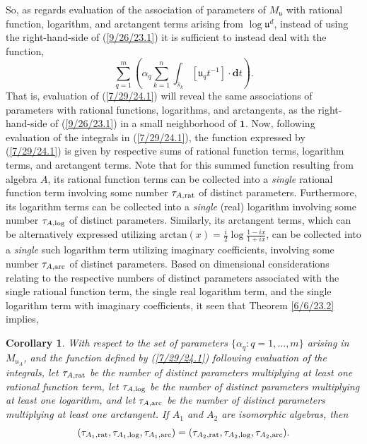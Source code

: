 \documentclass{amsart}
\numberwithin{equation}{section}
\newtheorem{corollary}[theorem]{Corollary}
\theoremstyle{definition}
\numberwithin{theorem}{section}
\begin{document}
So, as regards evaluation of the association of parameters of $M_{\mathfrak{u}}$ with rational function, logarithm, and arctangent terms arising from $\log\mathfrak{u}^d$, instead of using the right-hand-side of (\ref{9/26/23.1}) it is sufficient to instead deal with the function,
\begin{equation}\label{7/29/24.1} \sum_{q=1}^m \left(\alpha_q\sum_{k=1}^n \int_{\hat{s}_k} [\mathfrak{u}_q t^{-1}]\cdot \mathbf{d}t\right).\end{equation} That is, evaluation of (\ref{7/29/24.1}) will reveal the same associations of parameters with rational functions, logarithms, and arctangents, as the right-hand-side of (\ref{9/26/23.1}) in a small neighborhood of $\mathbf{1}$.  Now, following evaluation of the integrals in (\ref{7/29/24.1}), the function expressed by (\ref{7/29/24.1}) is given by respective sums of rational function terms, logarithm terms, and arctangent terms.  Note that for this summed function resulting from algebra $A$, its rational function terms can be collected into a {\it single} rational function term involving some number $\tau_{A,{\rm rat}}$ of distinct parameters.  Furthermore, its logarithm terms can be collected into a {\it single} (real) logarithm involving some number $\tau_{A,{\rm log}}$ of distinct parameters.  Similarly, its arctangent terms, which can be alternatively expressed utilizing $\text{arctan}(x) = \frac{i}{2}\log\frac{1-ix}{1+ix}$, can be collected into a {\it single} such logarithm term utilizing imaginary coefficients, involving some number $\tau_{A,{\rm arc}}$ of distinct parameters. 
Based on dimensional considerations relating to the respective numbers of distinct parameters associated with the single rational function term, the single real logarithm term, and the single logarithm term with imaginary coefficients, it seen that Theorem \ref{6/6/23.2} implies,


\begin{corollary}\label{7/25/24.1} With respect to the set of parameters $\{\alpha_q:q=1,\dots,m\}$ arising in $M_{\mathfrak{u}_A}$, and the function defined by (\ref{7/29/24.1}) following evaluation of the integrals, let $\tau_{A,{\rm rat}}$ be the number of distinct parameters multiplying at least one rational function term, let $\tau_{A,{\rm log}}$ be the number of distinct parameters multiplying at least one logarithm, and let $\tau_{A,{\rm arc}}$ be the number of distinct parameters multiplying at least one arctangent.  If $A_1$ and $A_2$ are isomorphic algebras, then \[ (\tau_{A_1,{\rm rat}},\tau_{A_1,{\rm log}},\tau_{A_1,{\rm arc}}) = (\tau_{A_2,{\rm rat}},\tau_{A_2,{\rm log}},\tau_{A_2,{\rm arc}}).\]
\end{corollary}
\end{document}

